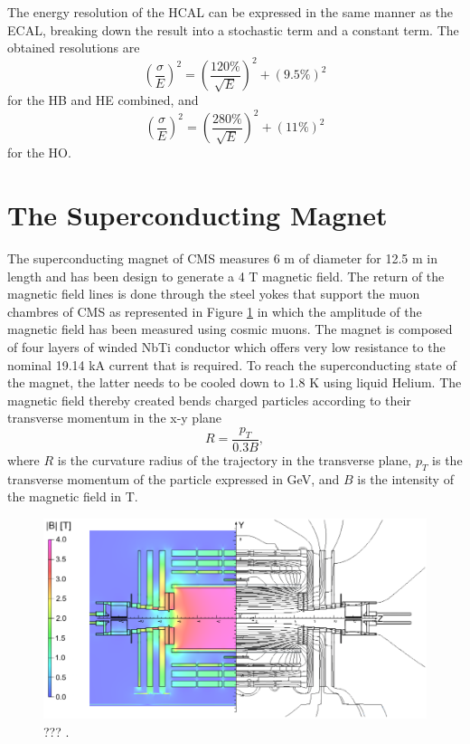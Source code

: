     The energy resolution of the HCAL can be expressed in the same manner as the ECAL, breaking down the result into a stochastic term and a constant term. The obtained resolutions \cite{Baiatian:1049929} are
    \begin{equation}
      \left( \frac{\sigma}{E} \right)^2 = \left( \frac{120\%}{\sqrt{E}} \right)^2 + (9.5\%)^2
    \end{equation}
    for the HB and HE combined, and
    \begin{equation}
      \left( \frac{\sigma}{E} \right)^2 = \left( \frac{280\%}{\sqrt{E}} \right)^2 + (11\%)^2
    \end{equation}
    for the HO.

  \section{The Superconducting Magnet}

    The superconducting magnet of CMS measures 6 m of diameter for 12.5 m in length and has been design to generate a 4 T magnetic field. The return of the magnetic field lines is done through the steel yokes that support the muon chambres of CMS as represented in Figure  \ref{fig:I-3-cms-magnet} in which the amplitude of the magnetic field has been measured using cosmic muons. The magnet is composed of four layers of winded NbTi conductor which offers very low resistance to the nominal 19.14 kA current that is required. To reach the superconducting state of the magnet, the latter needs to be cooled down to 1.8 K using liquid Helium. The magnetic field thereby created bends charged particles according to their transverse momentum in the x-y plane
    \begin{equation}
      R = \frac{p_T}{0.3 B} ,
    \end{equation}
    where $ R $ is the curvature radius of the trajectory in the transverse plane, $ p_T $ is the transverse momentum of the particle expressed in GeV, and $ B $ is the intensity of the magnetic field in T.

    \begin{figure}[h!]
      \centering
      \includegraphics[width=\textwidth]{img/I-3-cms/magnet.png}
      \caption{??? \cite{Chatrchyan:2009si}.}
      \label{fig:I-3-cms-magnet}
    \end{figure}

